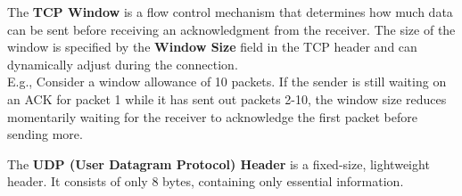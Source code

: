 \newpage

\begin{Def}

    The \textbf{TCP Window} is a flow control mechanism that determines how much data can be sent before receiving an acknowledgment from the receiver. 
    The size of the window is specified by the \textbf{Window Size} field in the TCP header and can dynamically adjust during the connection.\\

    \noindent
    E.g., Consider a window allowance of 10 packets. If the sender is still waiting on an ACK for packet 1 while it has sent out packets 2-10, the window size reduces momentarily
    waiting for the receiver to acknowledge the first packet before sending more. \hfill \cite{rfc793}
    
\end{Def}

\begin{Def}

    The \textbf{UDP (User Datagram Protocol) Header} is a fixed-size, lightweight header. 
    It consists of only 8 bytes, containing only essential information. \hfill \cite{rfc768}
\end{Def}

\begin{table}[h]
    \centering
    \caption{Fields of the UDP Header}
    \label{tab:udp-header}
\end{table}    

